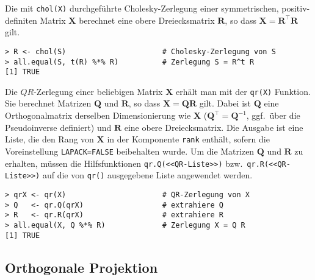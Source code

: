 Die mit \lstinline!chol(X)! durchgeführte Cholesky-Zerlegung einer symmetrischen, positiv-definiten Matrix $\bm{X}$ berechnet eine obere Dreiecksmatrix $\bm{R}$, so dass $\bm{X} = \bm{R}^{\top} \bm{R}$ gilt.
\begin{lstlisting}
> R <- chol(S)                      # Cholesky-Zerlegung von S
> all.equal(S, t(R) %*% R)          # Zerlegung S = R^t R
[1] TRUE
\end{lstlisting}

Die $QR$-Zerlegung einer beliebigen Matrix $\bm{X}$ erhält man mit der \lstinline!qr(X)! Funktion. Sie berechnet Matrizen $\bm{Q}$ und $\bm{R}$, so dass $\bm{X} = \bm{Q} \bm{R}$ gilt. Dabei ist $\bm{Q}$ eine Orthogonalmatrix derselben Dimensionierung wie $\bm{X}$ ($\bm{Q}^{\top} = \bm{Q}^{-1}$, ggf.\ über die Pseudoinverse definiert) und $\bm{R}$ eine obere Dreiecksmatrix. Die Ausgabe ist eine Liste, die den Rang von $\bm{X}$ in der Komponente \lstinline!rank! enthält, sofern die Voreinstellung \lstinline!LAPACK=FALSE! beibehalten wurde. Um die Matrizen $\bm{Q}$ und $\bm{R}$ zu erhalten, müssen die Hilfsfunktionen \lstinline!qr.Q(<<QR-Liste>>)! bzw.\ \lstinline!qr.R(<<QR-Liste>>)! auf die von \lstinline!qr()! ausgegebene Liste angewendet werden.
\begin{lstlisting}
> qrX <- qr(X)                      # QR-Zerlegung von X
> Q   <- qr.Q(qrX)                  # extrahiere Q
> R   <- qr.R(qrX)                  # extrahiere R
> all.equal(X, Q %*% R)             # Zerlegung X = Q R
[1] TRUE
\end{lstlisting}

\subsection{Orthogonale Projektion}
\label{sec:matOrthProj}

